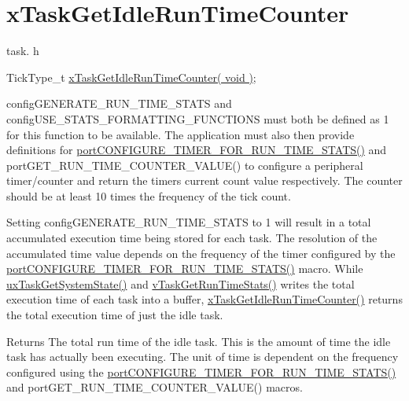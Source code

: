 \hypertarget{group__xTaskGetIdleRunTimeCounter}{}\section{x\+Task\+Get\+Idle\+Run\+Time\+Counter}
\label{group__xTaskGetIdleRunTimeCounter}
task. h 
\begin{DoxyPre}TickType\_t \hyperlink{task_8h_adcf1216358a193db9dea4ccdccd85dfd}{xTaskGetIdleRunTimeCounter( void )};\end{DoxyPre}


config\+G\+E\+N\+E\+R\+A\+T\+E\+\_\+\+R\+U\+N\+\_\+\+T\+I\+M\+E\+\_\+\+S\+T\+A\+TS and config\+U\+S\+E\+\_\+\+S\+T\+A\+T\+S\+\_\+\+F\+O\+R\+M\+A\+T\+T\+I\+N\+G\+\_\+\+F\+U\+N\+C\+T\+I\+O\+NS must both be defined as 1 for this function to be available. The application must also then provide definitions for \hyperlink{FreeRTOS_8h_a727939bcdb98501e0eba0ec8a1841e1b}{port\+C\+O\+N\+F\+I\+G\+U\+R\+E\+\_\+\+T\+I\+M\+E\+R\+\_\+\+F\+O\+R\+\_\+\+R\+U\+N\+\_\+\+T\+I\+M\+E\+\_\+\+S\+T\+A\+T\+S()} and port\+G\+E\+T\+\_\+\+R\+U\+N\+\_\+\+T\+I\+M\+E\+\_\+\+C\+O\+U\+N\+T\+E\+R\+\_\+\+V\+A\+L\+U\+E() to configure a peripheral timer/counter and return the timers current count value respectively. The counter should be at least 10 times the frequency of the tick count.

Setting config\+G\+E\+N\+E\+R\+A\+T\+E\+\_\+\+R\+U\+N\+\_\+\+T\+I\+M\+E\+\_\+\+S\+T\+A\+TS to 1 will result in a total accumulated execution time being stored for each task. The resolution of the accumulated time value depends on the frequency of the timer configured by the \hyperlink{FreeRTOS_8h_a727939bcdb98501e0eba0ec8a1841e1b}{port\+C\+O\+N\+F\+I\+G\+U\+R\+E\+\_\+\+T\+I\+M\+E\+R\+\_\+\+F\+O\+R\+\_\+\+R\+U\+N\+\_\+\+T\+I\+M\+E\+\_\+\+S\+T\+A\+T\+S()} macro. While \hyperlink{task_8h_aa4603f3de3d809e9beb18d10fbac005d}{ux\+Task\+Get\+System\+State()} and \hyperlink{task_8h_a52da9b427041a48dc9f6802e10f151d4}{v\+Task\+Get\+Run\+Time\+Stats()} writes the total execution time of each task into a buffer, \hyperlink{task_8h_adcf1216358a193db9dea4ccdccd85dfd}{x\+Task\+Get\+Idle\+Run\+Time\+Counter()} returns the total execution time of just the idle task.

\begin{DoxyReturn}{Returns}
The total run time of the idle task. This is the amount of time the idle task has actually been executing. The unit of time is dependent on the frequency configured using the \hyperlink{FreeRTOS_8h_a727939bcdb98501e0eba0ec8a1841e1b}{port\+C\+O\+N\+F\+I\+G\+U\+R\+E\+\_\+\+T\+I\+M\+E\+R\+\_\+\+F\+O\+R\+\_\+\+R\+U\+N\+\_\+\+T\+I\+M\+E\+\_\+\+S\+T\+A\+T\+S()} and port\+G\+E\+T\+\_\+\+R\+U\+N\+\_\+\+T\+I\+M\+E\+\_\+\+C\+O\+U\+N\+T\+E\+R\+\_\+\+V\+A\+L\+U\+E() macros. 
\end{DoxyReturn}
